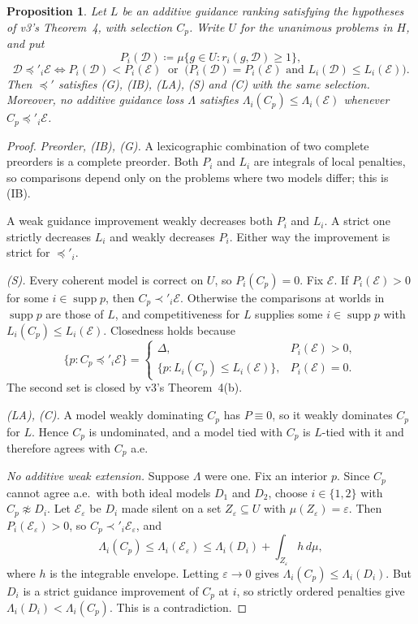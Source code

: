 \documentclass[11pt]{article}
\newtheorem{proposition}[theorem]{Proposition}
\theoremstyle{remark}\newtheorem{remark}[theorem]{Remark}
\newcommand{\Dscr}{\mathcal D}
\newcommand{\Escr}{\mathcal E}
\newcommand{\supp}{\operatorname{supp}}
\begin{document}
\begin{proposition}\label{prop:priority}
Let $L$ be an additive guidance ranking satisfying the hypotheses of v3's
Theorem~4, with selection $C_p$. Write $U$ for the unanimous problems
in $H$, and put
\[
 P_i(\Dscr)\coloneqq\mu\{g\in U:r_i(g,\Dscr)\ge1\},
\]
\[
 \Dscr\preceq'_i\Escr\iff P_i(\Dscr)<P_i(\Escr)\ \text{ or }\
 \bigl(P_i(\Dscr)=P_i(\Escr)\text{ and }L_i(\Dscr)\le L_i(\Escr)\bigr).
\]
Then $\preceq'$ satisfies (G), (IB), (LA), (S) and (C) with the same
selection. Moreover, no additive guidance loss $\Lambda$ satisfies
$\Lambda_i(C_p)\le\Lambda_i(\Escr)$ whenever $C_p\preceq'_i\Escr$.
\end{proposition}
\begin{proof}
\emph{Preorder, (IB), (G).} A lexicographic combination of two complete
preorders is a complete preorder. Both $P_i$ and $L_i$ are integrals of local
penalties, so comparisons depend only on the problems where two models
differ; this is (IB).

A weak guidance improvement weakly decreases both $P_i$ and $L_i$. A strict
one strictly decreases $L_i$ and weakly decreases $P_i$. Either way the
improvement is strict for $\preceq'_i$.

\emph{(S).} Every coherent model is correct on $U$, so $P_i(C_p)=0$. Fix
$\Escr$. If $P_i(\Escr)>0$ for some $i\in\supp p$, then $C_p\prec'_i\Escr$.
Otherwise the comparisons at worlds in $\supp p$ are those of $L$, and
competitiveness for $L$ supplies some $i\in\supp p$ with
$L_i(C_p)\le L_i(\Escr)$. Closedness holds because
\[
 \{p:C_p\preceq'_i\Escr\}=
 \begin{cases}
 \Delta, & P_i(\Escr)>0,\\
 \{p:L_i(C_p)\le L_i(\Escr)\}, & P_i(\Escr)=0.
 \end{cases}
\]
The second set is closed by v3's Theorem~4(b).

\emph{(LA), (C).} A model weakly dominating $C_p$ has $P\equiv0$, so it
weakly dominates $C_p$ for $L$. Hence $C_p$ is undominated, and a model
tied with $C_p$ is $L$-tied with it and therefore agrees with $C_p$ a.e.

\emph{No additive weak extension.} Suppose $\Lambda$ were one. Fix an
interior $p$. Since $C_p$ cannot agree a.e.\ with both ideal models $D_1$ and
$D_2$, choose $i\in\{1,2\}$ with $C_p\not\approx D_i$. Let $\Escr_\varepsilon$ be $D_i$ made
silent on a set $Z_\varepsilon\subseteq U$ with $\mu(Z_\varepsilon)=\varepsilon$.
Then $P_i(\Escr_\varepsilon)>0$, so $C_p\prec'_i\Escr_\varepsilon$, and
\[
 \Lambda_i(C_p)\le\Lambda_i(\Escr_\varepsilon)
 \le\Lambda_i(D_i)+\int_{Z_\varepsilon}h\,d\mu,
\]
where $h$ is the integrable envelope. Letting $\varepsilon\to0$ gives
$\Lambda_i(C_p)\le\Lambda_i(D_i)$. But $D_i$ is a strict guidance
improvement of $C_p$ at $i$, so strictly ordered penalties give
$\Lambda_i(D_i)<\Lambda_i(C_p)$. This is a contradiction.
\end{proof}
\end{document}
